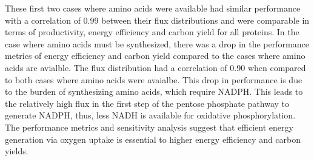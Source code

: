 \documentclass[journal=asbcd6,manuscript=article]{achemso}
\begin{document}
These first two cases where amino acids were available had similar performance with a correlation of 0.99 between their flux distributions and were comparable in terms of productivity, energy efficiency and carbon yield for all proteins.
In the case where amino acids must be synthesized, there was a drop in the performance metrics of energy efficiency and carbon yield compared to the cases where amino acids are avialble.
The flux distribution had a correlation of 0.90 when compared to both cases where amino acids were avaialbe.
This drop in performance is due to the burden of synthesizing amino acids, which require NADPH.
This leads to the relatively high flux in the first step of the pentose phosphate pathway to generate NADPH, thus, less NADH is available for oxidative phosphorylation.
The performance metrics and sensitivity analysis suggest that efficient energy generation via oxygen uptake is essential to higher energy efficiency and carbon yields.
\end{document}
